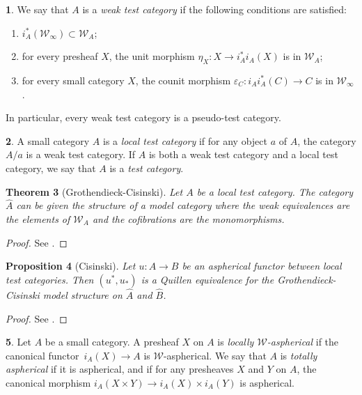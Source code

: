 \documentclass[10pt, english, a4paper, nothms]{amsart}
\theoremstyle{plain}
\newtheorem{theorem}{Theorem}[section]
\newtheorem{prop}[theorem]{Proposition}
\theoremstyle{remark}
\theoremstyle{definition}
\newtheorem{paragr}[theorem]{}
\numberwithin{equation}{theorem}
\newcommand{\pref}[1]{{\widehat{ #1 }}}
\newcommand{\tranche}[2]{#1/{#2}}
\newcommand{\W}{\mathcal{W}}
\let\epsilon\varepsilon
\begin{document}
\begin{paragr}
We say that $A$ is a \emph{weak test category} if the following
conditions are satisfied: 
\begin{enumerate}
\item $i_A^*(\W_\infty) \subset \W_A$;
\item for every presheaf $X$, the unit morphism $\eta_X: X \to
i_A^*i_A(X)$ is in $\W_A$;
\item for every small category $X$, the counit morphism $\epsilon_C:
i_Ai_A^*(C)\to C$ is in $\W_\infty$.
\end{enumerate}
In particular, every weak test category is a pseudo-test category.
\end{paragr}

 \begin{paragr}
A small category $A$ is a \emph{local test category} if for any object
$a$ of $A$, the category $\tranche{A}{a}$ is a weak test category. If
$A$ is both a weak test category and a local test category, we say
that $A$ is a \emph{test category}.
 \end{paragr}

\begin{theorem}[Grothendieck-Cisinski]\label{thm:modelStructureCisinski}
Let $A$ be a local test category. The category $\pref{A}$ can be given
the structure of a model category where the weak equivalences are the elements
of $\W_A$ and the cofibrations are the monomorphisms.
\end{theorem}
\begin{proof}
See \cite[Corollary 4.2.18]{cisinskipref}.
\end{proof}

\begin{prop}[Cisinski]\label{StructureCisinskiMorphAspheriquesEqQuillen}
Let $u:A \to B$ be an aspherical functor between local test
categories. Then $(u^*,u_*)$ is a Quillen equivalence for the
Grothendieck-Cisinski model structure on $\pref{A}$ and $\pref{B}$.
\end{prop}
\begin{proof}
See \cite[Proposition 6.4.29]{cisinskipref}.
\end{proof}

\begin{paragr}
Let $A$ be a small category. A presheaf $X$ on $A$ is \emph{locally
$\W$-aspherical} if the canonical functor~$i_A(X)\to A$ is
$\W$-aspherical. We say that $A$ is \emph{totally aspherical} if it is
aspherical, and if for any presheaves $X$ and $Y$ on $A$, the
canonical morphism $i_A(X\times Y) \to i_A(X)\times i_A(Y)$ is
aspherical. 
\end{paragr}
\end{document}
